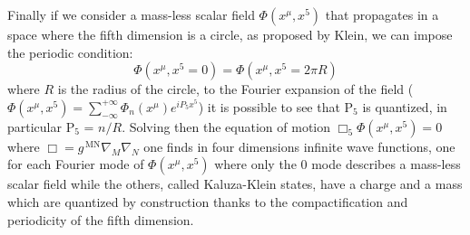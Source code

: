 Finally if we consider a mass-less scalar field $\Phi(x^\mu, x^5)$ that
propagates in a space where the fifth dimension is a circle, as proposed by
Klein, we can impose the periodic condition:
\begin{equation}
  \label{eq:107}
  \Phi(x^\mu, x^5 = 0) = \Phi(x^\mu, x^5 = 2 \pi R)
\end{equation}
where $R$ is the radius of the circle, to the Fourier expansion of the field
($\Phi(x^\mu, x^5) = \sum_{- \infty}^{+ \infty} \Phi_n(x^\mu) e^{i P_5 x^5}$) it
is possible to see that P$_5$ is quantized, in particular P$_5$ = $n /
R$. Solving then the equation of motion $\Box_5 \Phi (x^\mu, x^5) = 0$ where
$\Box = g^{\mathrm{\, MN}} \nabla_M \nabla_N$ one finds in four dimensions
infinite wave functions, one for each Fourier mode of $\Phi (x^\mu, x^5)$ where
only the 0 mode describes a mass-less scalar field while the others, called
Kaluza-Klein states, have a charge and a mass which are quantized by
construction thanks to the compactification and periodicity of the fifth
dimension.
